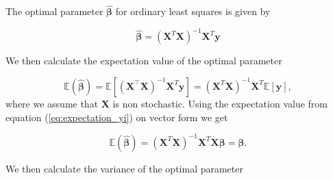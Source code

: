 The optimal parameter $\hat{\boldsymbol{\beta}}$ for ordinary least squares is given by

$$
\hat{\boldsymbol\beta}=(\mathbf{X}^T\mathbf{X})^{-1}\mathbf{X}^T\mathbf{y}
$$


We then calculate the expectation value of the optimal parameter

$$
\mathbb{E}(\boldsymbol{\hat{\beta}}) = \mathbb{E}[ (\mathbf{X}^{\top} \mathbf{X})^{-1}\mathbf{X}^{T} \mathbf{y}]=(\mathbf{X}^{T} \mathbf{X})^{-1}\mathbf{X}^{T} \mathbb{E}[ \mathbf{y}],
$$
where we assume that $\mathbf{X}$ is non stochastic. Using the expectation value from equation (\ref{eq:expectation_yi}) on vector form we get

\begin{equation}\label{eq:expectation_beta}
\mathbb{E}(\boldsymbol{\hat{\beta}}) = (\mathbf{X}^{T} \mathbf{X})^{-1} \mathbf{X}^{T}\mathbf{X}\boldsymbol{\beta}=\boldsymbol{\beta}.
\end{equation}

We then calculate the variance of the optimal parameter



